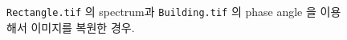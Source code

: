 \documentclass[a4paper, 12p]{paper}
\def\code#1{\texttt{#1}}
\begin{document}
\begin{figure}[H]
\centering
{}
\caption{\code{Rectangle.tif} 의 spectrum과 \code{Building.tif} 의 phase angle 을 이용해서 이미지를 복원한 경우.}
\end{figure}\label{fig:impl1_1}
\end{document}
